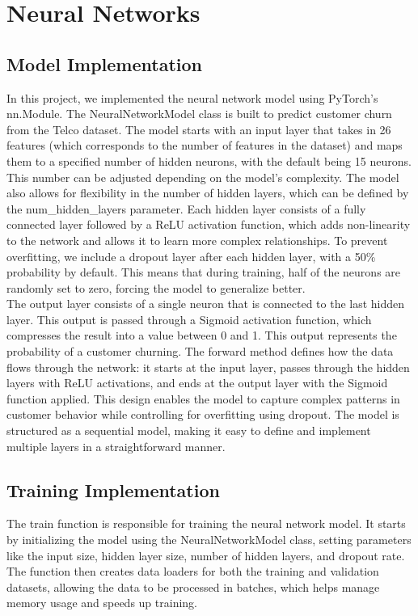 \section{Neural Networks}
\subsection{Model Implementation}
In this project, we implemented the neural network model using PyTorch’s nn.Module. The NeuralNetworkModel class is built to predict customer churn from the Telco dataset. The model starts with an input layer that takes in 26 features (which corresponds to the number of features in the dataset) and maps them to a specified number of hidden neurons, with the default being 15 neurons. This number can be adjusted depending on the model's complexity. The model also allows for flexibility in the number of hidden layers, which can be defined by the num\_hidden\_layers parameter. Each hidden layer consists of a fully connected layer followed by a ReLU activation function, which adds non-linearity to the network and allows it to learn more complex relationships. To prevent overfitting, we include a dropout layer after each hidden layer, with a 50\% probability by default. This means that during training, half of the neurons are randomly set to zero, forcing the model to generalize better.\\

The output layer consists of a single neuron that is connected to the last hidden layer. This output is passed through a Sigmoid activation function, which compresses the result into a value between 0 and 1. This output represents the probability of a customer churning. The forward method defines how the data flows through the network: it starts at the input layer, passes through the hidden layers with ReLU activations, and ends at the output layer with the Sigmoid function applied. This design enables the model to capture complex patterns in customer behavior while controlling for overfitting using dropout. The model is structured as a sequential model, making it easy to define and implement multiple layers in a straightforward manner.

\subsection{Training Implementation}
The train function is responsible for training the neural network model. It starts by initializing the model using the NeuralNetworkModel class, setting parameters like the input size, hidden layer size, number of hidden layers, and dropout rate. The function then creates data loaders for both the training and validation datasets, allowing the data to be processed in batches, which helps manage memory usage and speeds up training.\\

